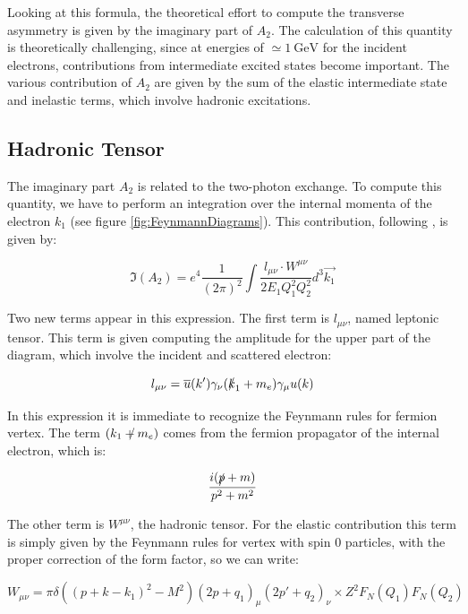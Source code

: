 Looking at this formula, the theoretical effort to compute the transverse asymmetry is given by the imaginary part of $A_{2}$. The calculation of this quantity is theoretically challenging, since at energies of $\simeq \SI{1}{\giga \electronvolt}$ for the incident electrons, contributions from intermediate excited states become important. The various contribution of $A_{2}$ are given by the sum of the elastic intermediate state and inelastic terms, which involve hadronic excitations.

\subsection{Hadronic Tensor}

The imaginary part $A_{2}$ is related to the two-photon exchange. To compute this quantity, we have to perform an integration over the internal momenta of the electron $k_{1}$ (see figure \ref{fig:FeynmannDiagrams}). This contribution, following \cite{Gorchtein_2008}, is given by:

\begin{equation}
\Im(A_{2}) = e^{4} \frac{1}{(2\pi)^{2}} \int \dfrac{l_{\mu \nu} \cdot W^{\mu \nu}}{2E_{1} Q_{1}^{2} Q_{2}^{2}} d^{3}\vec{k_{1}}
\end{equation}

Two new terms appear in this expression. The first term is $l_{\mu \nu}$, named leptonic tensor. This term is given computing the amplitude for the upper part of the diagram, which involve the incident and scattered electron:

\begin{equation}
l_{\mu \nu} = \overline{u}(k') \gamma_{\nu} (\slashed{k}_{1} + m_{e}) \gamma_{\mu} u(k)
\end{equation}

In this expression it is immediate to recognize the Feynmann rules for fermion vertex. The term $(\slashed{k_{1} + m_{e}})$ comes from the fermion propagator of the internal electron, which is:

\begin{align*}
\dfrac{i(\slashed{p} + m)}{p^{2} + m^{2}}
\end{align*}

The other term is $W^{\mu \nu}$, the hadronic tensor. For the elastic contribution this term is simply given by the Feynmann rules for vertex with spin 0 particles, with the proper correction of the form factor, so we can write:

\begin{equation}
W_{\mu \nu} = \pi \delta((p + k - k_{1})^{2} - M^{2}) (2p + q_{1})_{\mu} (2p' + q_{2})_{\nu} \times Z^{2} F_{N}(Q_{1})  F_{N}(Q_{2})
\end{equation}

